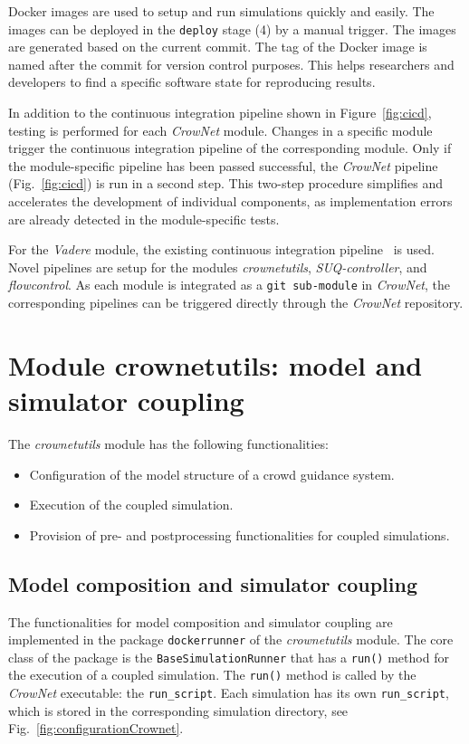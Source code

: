 Docker images are used to setup and run simulations quickly and easily. The images can be  deployed in the \lstinline{deploy} stage (4) by a manual trigger. The images are generated based on the current commit. The tag of the Docker image is named after the commit for version control purposes. This  helps researchers and developers to find a specific software state for reproducing results.\textit{}





In addition to the continuous integration pipeline shown in Figure~\ref{fig:cicd}, testing is performed for each \textit{CrowNet} module. Changes in a specific module trigger the continuous integration pipeline of the corresponding module. Only if the module-specific pipeline has been passed successful, the \textit{CrowNet} pipeline (Fig.~\ref{fig:cicd}) is run in a second step. This two-step procedure simplifies and accelerates the development of individual components, as implementation errors are already detected in the module-specific tests. 

For the \textit{Vadere} module, the existing continuous integration pipeline~\cite{kleinmeier-2021-cdyn} is used. Novel pipelines are setup for the modules \textit{crownetutils}, \textit{SUQ-controller}, and \textit{flowcontrol}. As each module is integrated as a \lstinline{git sub-module} in \textit{CrowNet}, the corresponding pipelines can be triggered directly through the \textit{CrowNet} repository.



\section{Module crownetutils: model and simulator coupling}
\label{sec:crownetutils}

The \textit{crownetutils} module has the following functionalities:
\begin{itemize}
\item Configuration of the model structure of a crowd guidance system.
\item Execution of the coupled simulation.
\item Provision of pre- and postprocessing functionalities for coupled simulations.
\end{itemize} 


\subsection{Model composition and simulator coupling}
The functionalities for model composition and simulator coupling are implemented in the package \lstinline{dockerrunner} of the \textit{crownetutils} module. The core class of the package is the \lstinline{BaseSimulationRunner} that has a \lstinline{run()} method for the execution of a coupled simulation. The \lstinline{run()} method is called by the \textit{CrowNet} executable: the \lstinline{run_script}. Each simulation has its own \lstinline{run_script}, which is stored in the corresponding simulation directory, see Fig.~\ref{fig:configurationCrownet}. 


